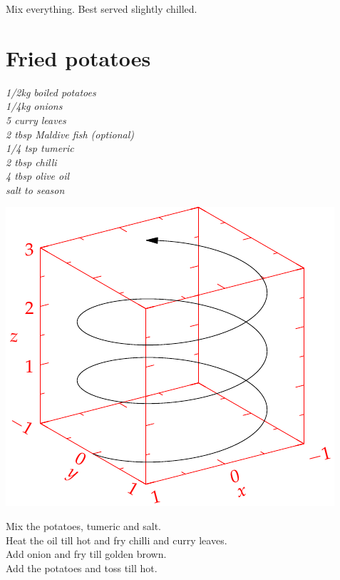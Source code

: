 \documentclass{tufte-book}
\begin{document}
Mix everything. Best served slightly chilled.



\section{Fried potatoes}
\emph{1/2kg boiled potatoes
\\1/4kg onions
\\5 curry leaves
\\2 tbsp Maldive fish (optional)
\\1/4 tsp tumeric
\\2 tbsp chilli
\\4 tbsp olive oil
\\salt to season
}

\begin{marginfigure}%
  \includegraphics[width=\linewidth]{helix}
\end{marginfigure}

Mix the potatoes, tumeric and salt.
\\Heat the oil till hot and fry chilli and curry leaves.
\\Add onion and fry till golden brown.
\\Add the potatoes and toss till hot.
\end{document}
